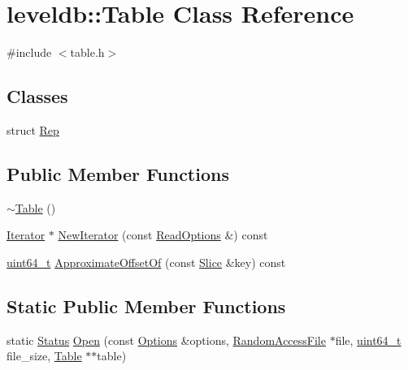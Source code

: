 \hypertarget{classleveldb_1_1_table}{}\section{leveldb\+:\+:Table Class Reference}
\label{classleveldb_1_1_table}


{\ttfamily \#include $<$table.\+h$>$}

\subsection*{Classes}
\begin{DoxyCompactItemize}
\item 
struct \hyperlink{structleveldb_1_1_table_1_1_rep}{Rep}
\end{DoxyCompactItemize}
\subsection*{Public Member Functions}
\begin{DoxyCompactItemize}
\item 
\hyperlink{classleveldb_1_1_table_a945f1f97b4f53402f5d55422a4dd3af2}{$\sim$\+Table} ()
\item 
\hyperlink{classleveldb_1_1_iterator}{Iterator} $\ast$ \hyperlink{classleveldb_1_1_table_ad354f57ece050ca0c5f42669b7c01cc2}{New\+Iterator} (const \hyperlink{structleveldb_1_1_read_options}{Read\+Options} \&) const 
\item 
\hyperlink{stdint_8h_aaa5d1cd013383c889537491c3cfd9aad}{uint64\+\_\+t} \hyperlink{classleveldb_1_1_table_a1795d45c54945ee7652b19e6ad6c030b}{Approximate\+Offset\+Of} (const \hyperlink{classleveldb_1_1_slice}{Slice} \&key) const 
\end{DoxyCompactItemize}
\subsection*{Static Public Member Functions}
\begin{DoxyCompactItemize}
\item 
static \hyperlink{classleveldb_1_1_status}{Status} \hyperlink{classleveldb_1_1_table_aa25d0e074ab4de46e583522a8c0e9582}{Open} (const \hyperlink{structleveldb_1_1_options}{Options} \&options, \hyperlink{classleveldb_1_1_random_access_file}{Random\+Access\+File} $\ast$file, \hyperlink{stdint_8h_aaa5d1cd013383c889537491c3cfd9aad}{uint64\+\_\+t} file\+\_\+size, \hyperlink{classleveldb_1_1_table}{Table} $\ast$$\ast$table)
\end{DoxyCompactItemize}
